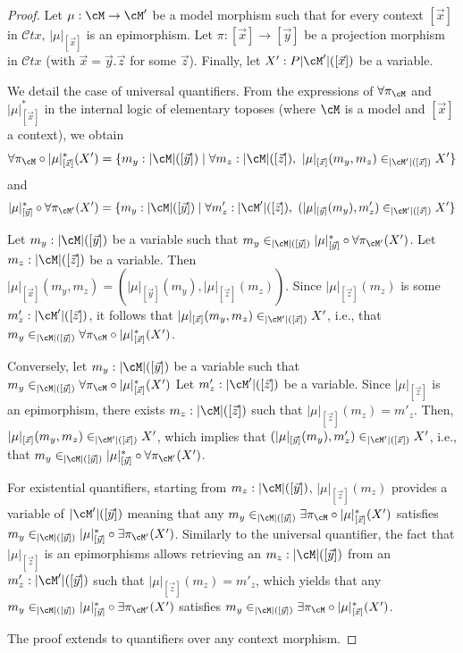 \documentclass[preprint,3p,times]{elsarticle}
\newcommand{\Ctx}{\mathcal{C}tx}
\begin{document}
\begin{proof}
Let \(\mu: \cM \to \cM'\) be a model morphism such that for every context \([\vec{x}]\) in \(\Ctx\), \(|\mu|_{[\vec{x}]}\) is an epimorphism.
Let $\pi : [\vec{x}] \to [\vec{y}]$ be a projection morphism in $\Ctx$ (with \(\vec{x} = \vec{y}.\vec{z}\) for some \(\vec{z}\)).
Finally, let \(X' : P |\cM'|([\vec{x}])\) be a variable.

We detail the case of universal quantifiers.
From the expressions of \(\forall \pi_\cM\) and \(|\mu|^*_{[\vec{x}]}\) in the internal logic of elementary toposes (where \(\cM\) is a model and \([\vec{x}]\) a context), we obtain
\[
    \forall \pi_{\cM} \circ |\mu|^*_{[\vec{x}]}(X') = \{ m_y : |\cM|([\vec{y}]) \mid \forall m_z : |\cM|([\vec{z}]),~ |\mu|_{[\vec{x}]}(m_y,m_z) \in_{|\cM'|([\vec{x}])} X' \}
\]
and 
\[
    |\mu|^*_{[\vec{y}]} \circ \forall \pi_{\cM'}(X') = \{ m_y : |\cM|([\vec{y}]) \mid \forall m'_z : |\cM'|([\vec{z}]),~
    (|\mu|_{[\vec{y}]}(m_y),m'_z) \in_{|\cM'|([\vec{x}])} X' \}
\]

Let \(m_y : |\cM|([\vec{y}])\) be a variable such that \(m_y \in_{|\cM|([\vec{y}])} |\mu|^*_{[\vec{y}]} \circ \forall \pi_{\cM'}(X')\).
Let \(m_z : |\cM|([\vec{z}])\) be a variable.
Then \(|\mu|_{[\vec{x}]}(m_y,m_z) = (|\mu|_{[\vec{y}]}(m_y),|\mu|_{[\vec{z}]}(m_z))\).
Since \(|\mu|_{[\vec{z}]}(m_z)\) is some \(m'_z : |\cM'|([\vec{z}])\), it follows that \(|\mu|_{[\vec{x}]}(m_y,m_z) \in_{|\cM'|([\vec{x}])} X'\), i.e., that \(m_y \in_{|\cM|([\vec{y}])} \forall \pi_{\cM} \circ |\mu|^*_{[\vec{x}]}(X')\).

Conversely, let \(m_y : |\cM|([\vec{y}])\) be a variable such that \(m_y \in_{|\cM|([\vec{y}])} \forall \pi_{\cM} \circ |\mu|^*_{[\vec{x}]}(X')\)
Let \(m'_z : |\cM'|([\vec{z}])\) be a variable.
Since \(|\mu|_{[\vec{z}]}\) is an epimorphism, there exists \(m_z : |\cM|([\vec{z}])\) such that \(|\mu|_{[\vec{z}]}(m_z) = m'_z\).
Then, \(|\mu|_{[\vec{x}]}(m_y,m_z) \in_{|\cM'|([\vec{x}])} X'\), which implies that \((|\mu|_{[\vec{y}]}(m_y),m'_z) \in_{|\cM'|([\vec{x}])} X'\), i.e., that \(m_y \in_{|\cM|([\vec{y}])} |\mu|^*_{[\vec{y}]} \circ \forall \pi_{\cM'}(X')\).

\medskip
For existential quantifiers, starting from \(m_z : |\cM|([\vec{y}])\), \(|\mu|_{[\vec{z}]}(m_z)\) provides a variable of \(|\cM'|([\vec{y}])\) meaning that any \(m_y \in_{|\cM|([\vec{y}])} \exists \pi_{\cM} \circ |\mu|^*_{[\vec{x}]}(X')\) satisfies \(m_y \in_{|\cM|([\vec{y}])} |\mu|^*_{[\vec{y}]} \circ \exists \pi_{\cM'}(X')\). Similarly to the universal quantifier, the fact that \(|\mu|_{[\vec{z}]}\) is an epimorphisms allows retrieving an \(m_z : |\cM|([\vec{y}])\) from an \(m'_z : |\cM'|([\vec{y}])\) such that \(|\mu|_{[\vec{z}]}(m_z) = m'_z\), which yields that any \(m_y \in_{|\cM|([\vec{y}])} |\mu|^*_{[\vec{y}]} \circ \exists \pi_{\cM'}(X')\) satisfies \(m_y \in_{|\cM|([\vec{y}])} \exists \pi_{\cM} \circ |\mu|^*_{[\vec{x}]}(X')\).

\medskip
The proof extends to quantifiers over any context morphism.
\end{proof}
\end{document}
